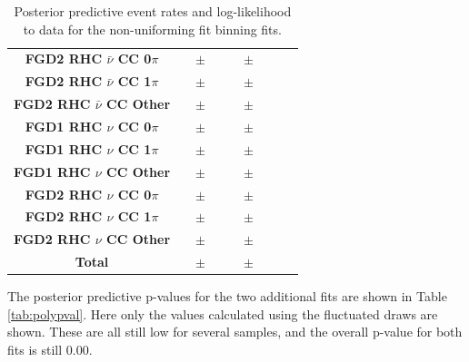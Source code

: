 \begin{center}
\begin{table}
\begin{adjustbox}{max width=1.1\textwidth,center}
\begin{tabular}{S||
                r
                p{0.26cm}
                r
                |r
                p{0.26cm}
                r
                |r
                r}
\textbf{FGD2 RHC $\bar{\nu}$ CC 0$\pi$} & & $\pm$ & & & $\pm$ & & &\\
\textbf{FGD2 RHC $\bar{\nu}$ CC 1$\pi$} & & $\pm$ & & & $\pm$ & & &\\
\textbf{FGD2 RHC $\bar{\nu}$ CC Other} & & $\pm$ & & & $\pm$ & & &\\ \hline
\textbf{FGD1 RHC $\nu$ CC 0$\pi$} & & $\pm$ & & & $\pm$ & & &\\
\textbf{FGD1 RHC $\nu$ CC 1$\pi$} & & $\pm$ & & & $\pm$ & & &\\
\textbf{FGD1 RHC $\nu$ CC Other} & & $\pm$ & & & $\pm$ & & &\\ \hline
\textbf{FGD2 RHC $\nu$ CC 0$\pi$} & & $\pm$ & & & $\pm$ & & &\\
\textbf{FGD2 RHC $\nu$ CC 1$\pi$} & & $\pm$ & & & $\pm$ & & &\\
\textbf{FGD2 RHC $\nu$ CC Other} & & $\pm$ & & & $\pm$ & & &\\ \hline
\textbf{Total} & & $\pm$ & & & $\pm$ & & & \\ \hline\hline
\end{tabular}
\end{adjustbox}
\caption{Posterior predictive event rates and log-likelihood to data for the non-uniforming fit binning fits.}
\label{tab:polyrates}
\end{table}
\end{center}%

The posterior predictive p-values for the two additional fits are shown in Table \ref{tab:polypval}. Here only the values calculated using the fluctuated draws are shown. These are all still low for several samples, and the overall p-value for both fits is still 0.00. %

